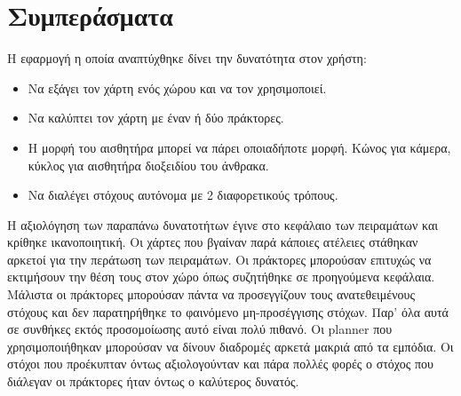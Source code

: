 \section{Συμπεράσματα}

Η εφαρμογή η οποία αναπτύχθηκε δίνει την δυνατότητα στον χρήστη: 

\begin{itemize}
	\item Να εξάγει τον χάρτη ενός χώρου και να τον χρησιμοποιεί.
	\item Να καλύπτει τον χάρτη με έναν ή δύο πράκτορες.
	\item Η μορφή του αισθητήρα μπορεί να πάρει οποιαδήποτε μορφή. Κώνος για κάμερα, κύκλος για αισθητήρα διοξειδίου του άνθρακα.
	\item Να διαλέγει στόχους αυτόνομα με 2 διαφορετικούς τρόπους. %
\end{itemize} 

\vspace{0.5 cm}

Η αξιολόγηση των παραπάνω δυνατοτήτων έγινε στο κεφάλαιο των πειραμάτων και κρίθηκε ικανοποιητική. Οι χάρτες που βγαίναν παρά κάποιες ατέλειες στάθηκαν αρκετοί για την περάτωση των πειραμάτων. Οι πράκτορες μπορούσαν επιτυχώς να εκτιμήσουν την θέση τους στον χώρο όπως συζητήθηκε σε προηγούμενα κεφάλαια.
Μάλιστα οι πράκτορες μπορούσαν πάντα να προσεγγίζουν τους ανατεθειμένους στόχους και δεν παρατηρήθηκε το φαινόμενο μη-προσέγγισης στόχων. Παρ' όλα αυτά σε συνθήκες εκτός προσομοίωσης αυτό είναι πολύ πιθανό. Οι planner που χρησιμοποιήθηκαν μπορούσαν να δίνουν διαδρομές αρκετά μακριά από τα εμπόδια.
Οι στόχοι που προέκυπταν όντως αξιολογούνταν και πάρα πολλές φορές ο στόχος που διάλεγαν οι πράκτορες ήταν όντως ο καλύτερος δυνατός. 



